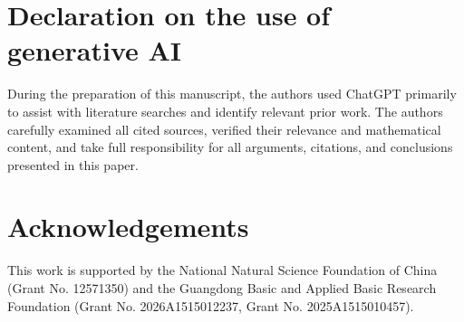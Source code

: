 \documentclass[12pt,a4paper]{article}
\numberwithin{equation}{section}
\theoremstyle{definition}
\theoremstyle{remark}
\begin{document}
\section*{Declaration on the use of generative AI}
During the preparation of this manuscript, the authors used ChatGPT  primarily to assist with literature searches and identify relevant prior work. The authors carefully examined all cited sources, verified their relevance and mathematical content, and take full responsibility for all arguments, citations, and conclusions presented in this paper.

\section*{Acknowledgements}
This work is supported by the National Natural Science Foundation of China (Grant No. 12571350) and the Guangdong Basic and Applied Basic Research Foundation (Grant No. 2026A1515012237, Grant No. 2025A1515010457). 
\begingroup
{}
\end{document}
